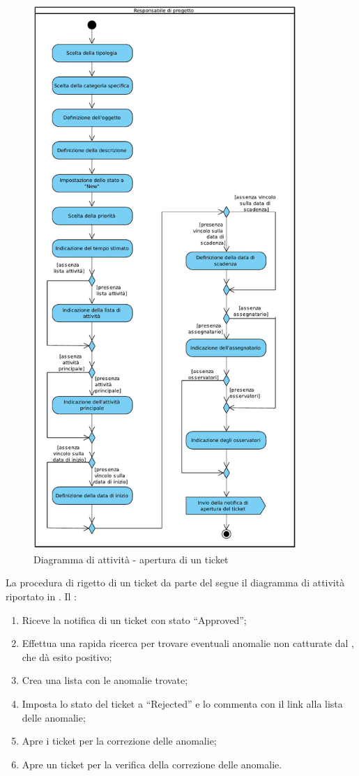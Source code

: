 \begin{figure}[H]
\centering
\includegraphics[width=10cm]{../immagini/aperturaTicket.pdf}
\caption{Diagramma di attività - apertura di un ticket}
\label{fig:aperturaTicket}
\end{figure}
La procedura di rigetto di un ticket da parte del \rRP segue il diagramma di attività riportato in .
Il \rRP:
\begin{enumerate}
\item Riceve la notifica di un ticket con stato ``Approved'';
\item Effettua una rapida ricerca per trovare eventuali anomalie non catturate dal \rV, che dà esito positivo;
\item Crea una lista con le anomalie trovate;
\item Imposta lo stato del ticket a ``Rejected'' e lo commenta con il link alla lista delle anomalie;
\item Apre i ticket per la correzione delle anomalie;
\item Apre un ticket per la verifica della correzione delle anomalie.
\end{enumerate}
